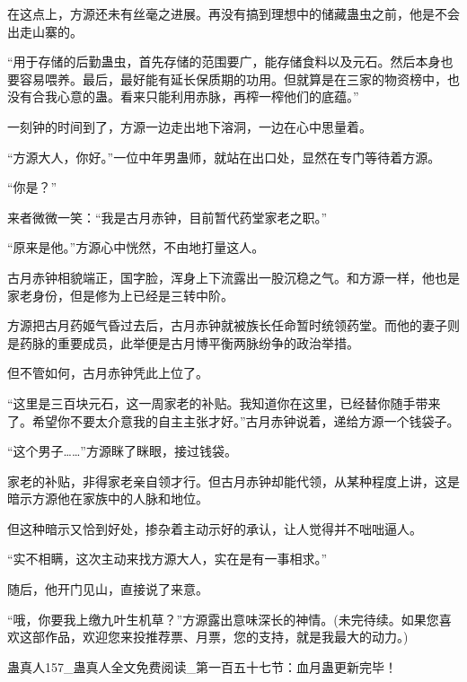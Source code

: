 \begin{this_body}
在这点上，方源还未有丝毫之进展。再没有搞到理想中的储藏蛊虫之前，他是不会出走山寨的。

“用于存储的后勤蛊虫，首先存储的范围要广，能存储食料以及元石。然后本身也要容易喂养。最后，最好能有延长保质期的功用。但就算是在三家的物资榜中，也没有合我心意的蛊。看来只能利用赤脉，再榨一榨他们的底蕴。”

一刻钟的时间到了，方源一边走出地下溶洞，一边在心中思量着。

“方源大人，你好。”一位中年男蛊师，就站在出口处，显然在专门等待着方源。

“你是？”

来者微微一笑：“我是古月赤钟，目前暂代药堂家老之职。”

“原来是他。”方源心中恍然，不由地打量这人。

古月赤钟相貌端正，国字脸，浑身上下流露出一股沉稳之气。和方源一样，他也是家老身份，但是修为上已经是三转中阶。

方源把古月药姬气昏过去后，古月赤钟就被族长任命暂时统领药堂。而他的妻子则是药脉的重要成员，此举便是古月博平衡两脉纷争的政治举措。

但不管如何，古月赤钟凭此上位了。

“这里是三百块元石，这一周家老的补贴。我知道你在这里，已经替你随手带来了。希望你不要太介意我的自主主张才好。”古月赤钟说着，递给方源一个钱袋子。

“这个男子……”方源眯了眯眼，接过钱袋。

家老的补贴，非得家老亲自领才行。但古月赤钟却能代领，从某种程度上讲，这是暗示方源他在家族中的人脉和地位。

但这种暗示又恰到好处，掺杂着主动示好的承认，让人觉得并不咄咄逼人。

“实不相瞒，这次主动来找方源大人，实在是有一事相求。”

随后，他开门见山，直接说了来意。

“哦，你要我上缴九叶生机草？”方源露出意味深长的神情。(未完待续。如果您喜欢这部作品，欢迎您来投推荐票、月票，您的支持，就是我最大的动力。)

蛊真人157\_蛊真人全文免费阅读\_第一百五十七节：血月蛊更新完毕！

\end{this_body}

